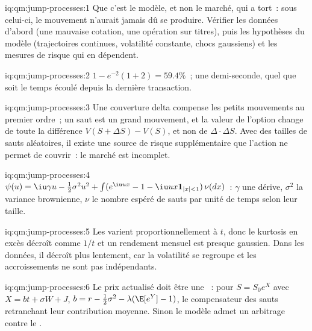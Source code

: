 \begin{solution}{iq:qm:jump-processes:1}
Que c'est le modèle, et non le marché, qui a tort~: sous celui-ci, le mouvement n'aurait jamais dû se produire. Vérifier les données
d'abord (une mauvaise cotation, une opération sur titres), puis les hypothèses du modèle (trajectoires continues, volatilité constante,
chocs gaussiens) et les mesures de risque qui en dépendent.
\end{solution}

\begin{solution}{iq:qm:jump-processes:2}
$1 - e^{-2}(1 + 2) = 59.4\%$~; une demi-seconde, quel que soit le temps écoulé depuis la dernière transaction.
\end{solution}

\begin{solution}{iq:qm:jump-processes:3}
Une couverture delta compense les petits mouvements au premier ordre~; un saut est un grand mouvement, et la valeur de l'option change
de toute la différence $V(S + \Delta S) - V(S)$, et non de $\Delta\cdot\Delta S$. Avec des tailles de sauts aléatoires, il existe une source de risque supplémentaire
que l'action ne permet de couvrir~: le marché est incomplet.
\end{solution}

\begin{solution}{iq:qm:jump-processes:4}
$\psi(u) = \iu\gamma u - \tfrac12\sigma^2u^2 + \int(e^{\iu ux} - 1 - \iu ux\mathbf 1_{|x|<1})\,\nu(dx)$~: $\gamma$ une dérive, $\sigma^2$ la
variance brownienne, $\nu$ le nombre espéré de sauts par unité de temps selon leur taille.
\end{solution}

\begin{solution}{iq:qm:jump-processes:5}
Les  varient proportionnellement à $t$, donc le kurtosis en excès décroît comme $1/t$ et un rendement mensuel est presque
gaussien. Dans les données, il décroît plus lentement, car la volatilité se regroupe et les accroissements ne sont pas
indépendants.
\end{solution}

\begin{solution}{iq:qm:jump-processes:6}
Le prix actualisé doit être une ~: pour $S = S_0e^X$ avec $X = bt + \sigma W + J$, $b = r - \tfrac12\sigma^2 -
\lambda(\E[e^Y] - 1)$, le compensateur des sauts retranchant leur contribution moyenne. Sinon le modèle
admet un arbitrage contre le .
\end{solution}
